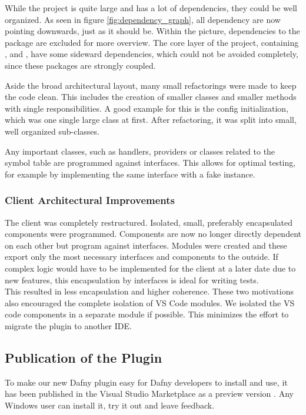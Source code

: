 While the project is quite large and has a lot of dependencies, they could be well organized.
As seen in figure \ref{fig:dependency_graph}, all dependency are now pointing downwards, just as it should be.
Within the picture, dependencies to the  package are excluded for more overview.
The core layer of the project, containing ,  and , have some sideward dependencies, which could not be avoided completely, since these packages are strongly coupled.

Aside the broad architectural layout, many small refactorings were made to keep the code clean.
This includes the creation of smaller classes and smaller methods with single responsibilities.
A good example for this is the config initialization, which was one single large class at first.
After refactoring, it was split into small, well organized sub-classes.

Any important classes, such as handlers, providers or classes related to the symbol table are programmed against interfaces.
This allows for optimal testing, for example by implementing the same interface with a fake instance.

\subsubsection{Client Architectural Improvements}
The client was completely restructured.
Isolated, small, preferably encapsulated components were programmed.
Components are now no longer directly dependent on each other but program against interfaces.
Modules were created and these export only the most necessary interfaces and components to the outside.
If complex logic would have to be implemented for the client at a later date due to new features,
this encapsulation by interfaces is ideal for writing tests. \\

This resulted in less encapsulation and higher coherence.
These two motivations also encouraged the complete isolation of VS Code modules.
We isolated the VS code components in a separate module if possible.
This minimizes the effort to migrate the plugin to another IDE.

\subsection{Publication of the Plugin}
To make our new Dafny plugin easy for Dafny developers to install and use,
it has been published in the Visual Studio Marketplace as a preview version \cite{our-dafny-plugin}.
Any Windows user can install it, try it out and leave feedback.

